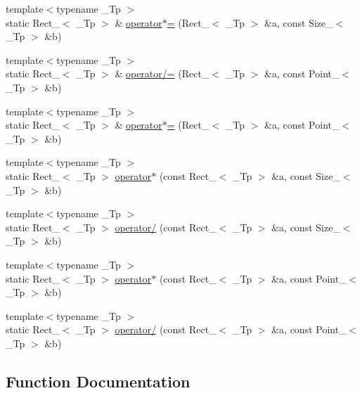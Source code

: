 \begin{DoxyCompactItemize}
{\footnotesize template$<$typename \+\_\+\+Tp $>$ }\\static Rect\+\_\+$<$ \+\_\+\+Tp $>$ \& \hyperlink{namespacecv_a7fc3d18fdf143b0d5f062493109693d0}{operator$\ast$=} (Rect\+\_\+$<$ \+\_\+\+Tp $>$ \&a, const Size\+\_\+$<$ \+\_\+\+Tp $>$ \&b)
\item 
{\footnotesize template$<$typename \+\_\+\+Tp $>$ }\\static Rect\+\_\+$<$ \+\_\+\+Tp $>$ \& \hyperlink{namespacecv_aa3fab8df76a0800a8531269ed836509e}{operator/=} (Rect\+\_\+$<$ \+\_\+\+Tp $>$ \&a, const Point\+\_\+$<$ \+\_\+\+Tp $>$ \&b)
\item 
{\footnotesize template$<$typename \+\_\+\+Tp $>$ }\\static Rect\+\_\+$<$ \+\_\+\+Tp $>$ \& \hyperlink{namespacecv_a8ca71891cc263594c4eb3d9cb7908e48}{operator$\ast$=} (Rect\+\_\+$<$ \+\_\+\+Tp $>$ \&a, const Point\+\_\+$<$ \+\_\+\+Tp $>$ \&b)
\item 
{\footnotesize template$<$typename \+\_\+\+Tp $>$ }\\static Rect\+\_\+$<$ \+\_\+\+Tp $>$ \hyperlink{namespacecv_a8b8e548e203846eb6e5b69992efc147c}{operator$\ast$} (const Rect\+\_\+$<$ \+\_\+\+Tp $>$ \&a, const Size\+\_\+$<$ \+\_\+\+Tp $>$ \&b)
\item 
{\footnotesize template$<$typename \+\_\+\+Tp $>$ }\\static Rect\+\_\+$<$ \+\_\+\+Tp $>$ \hyperlink{namespacecv_add06329d5e34385d6ed0c5efb762b253}{operator/} (const Rect\+\_\+$<$ \+\_\+\+Tp $>$ \&a, const Size\+\_\+$<$ \+\_\+\+Tp $>$ \&b)
\item 
{\footnotesize template$<$typename \+\_\+\+Tp $>$ }\\static Rect\+\_\+$<$ \+\_\+\+Tp $>$ \hyperlink{namespacecv_a2ef14e0506bb942bc2825619d011767e}{operator$\ast$} (const Rect\+\_\+$<$ \+\_\+\+Tp $>$ \&a, const Point\+\_\+$<$ \+\_\+\+Tp $>$ \&b)
\item 
{\footnotesize template$<$typename \+\_\+\+Tp $>$ }\\static Rect\+\_\+$<$ \+\_\+\+Tp $>$ \hyperlink{namespacecv_a6dd2e745eb38fede92054d9742cdc2e1}{operator/} (const Rect\+\_\+$<$ \+\_\+\+Tp $>$ \&a, const Point\+\_\+$<$ \+\_\+\+Tp $>$ \&b)
\end{DoxyCompactItemize}


\subsection{Function Documentation}
